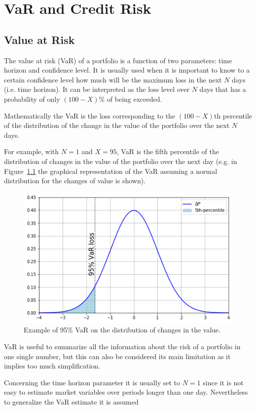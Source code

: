 \chapter{VaR and Credit Risk}\label{var-and-credit-risk}

\section{Value at Risk}\label{value-at-risk}

The value at risk (VaR) of a portfolio is a function of two parameters:
time horizon and confidence level. It is usually used when it
is important to know to a certain confidence level how
much will be the maximum loss in the next $N$ days (i.e. time horizon). 
It can be interpreted as the loss level over \(N\) days that has a 
probability of only \((100 - X)\%\) of being exceeded.

Mathematically the VaR is the loss corresponding to the
\((100-X)\textrm{th}\) percentile of the distribution of the change in
the value of the portfolio over the next \(N\) days. 

For example, with \(N=1\) and \(X=95\), VaR is the fifth percentile of the distribution of
changes in the value of the portfolio over the next day (e.g. in Figure~\ref{fig:var_loss}
the graphical representation of the VaR assuming a normal
distribution for the changes of value is shown).

\begin{figure}[htb]
\centering
  \includegraphics[width=0.6\linewidth]{figures/95_var.png}
  \caption{Example of 95\% VaR on the distribution of changes in the value.}
  \label{fig:var_loss}
\end{figure}
    
VaR is useful to summarize all the information about the risk of a
portfolio in one single number, but this can also be considered its main
limitation as it implies too much simplification.

Concerning the time horizon parameter it is usually set to \(N=1\) since
it is not easy to estimate market variables over periods longer than one
day. Nevertheless to generalize the VaR estimate it is assumed

